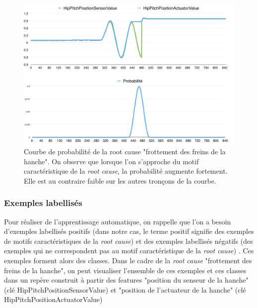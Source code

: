 \begin{figure}[h]
	\centering\includegraphics[width=12cm]{images/proba_motif.png}
	\caption[Courbe de probabilité de la root cause "frottement des freins de la hanche"]{Courbe de probabilité de la root cause "frottement des freins de la hanche".  On observe que lorsque l'on s'approche du motif caractéristique de la \emph{root cause}, la probabilité augmente fortement. Elle est au contraire faible sur les autres tronçons de la courbe.}
	\label{fig:Représentation de la répartition des exemples et des classes en fonction des features, approche fonctionnelle}
\end{figure}

\subsubsection{Exemples labellisés}
\label{Automatisation du processus d'investigation: Reconnaissance de motifs: Exemples labellisés}
Pour réaliser de l'apprentissage automatique, on rappelle que l'on a besoin d'exemples labellisés positifs (dans notre cas, le terme positif signifie des exemples de motifs caractéristiques de la \emph{root cause}) et des exemples labellisés négatifs (des exemples qui ne correspondent pas au motif caractéristique de la \emph{root cause}) . Ces exemples forment alors des classes. Dans le cadre de la \emph{root cause} "frottement des freins de la hanche", on peut visualiser l'ensemble de ces exemples et ces classes dans un repère construit à partir des features "position du senseur de la hanche" (clé HipPitchPositionSensorValue) et "position de l'actuateur de la hanche" (clé HipPitchPositionActuatorValue)

